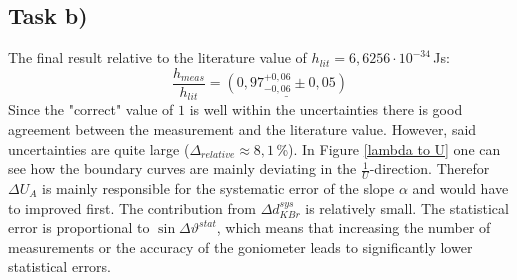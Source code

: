 \documentclass[a4paper,12pt]{article}
\newcommand{\kla}{}
\begin{document}
\subsection*{Task b)}
The final result relative to the literature value of $h_{lit}=6,6256\cdot 10^{-34}\,$Js:
$$\frac{h_{meas}}{h_{lit}}=\underline{\kla\left( {0,97_{-0,06}^{+0,06}\pm 0,05} \right)}$$
Since the "correct" value of $1$ is well within the uncertainties there is good agreement between the measurement and the literature value. However, said uncertainties are quite large ($\Delta_{relative}\approx 8,1\,$\%). In Figure \ref{lambda to U} one can see how the boundary curves are mainly deviating in the $\frac{1}{U}$-direction. Therefor $\Delta U_A$ is mainly responsible for the systematic error of the slope $\alpha$ and would have to improved first. The contribution from $\Delta d_{KBr}^{sys}$ is relatively small. The statistical error is proportional to $\sin\Delta\vartheta^{stat}$, which means that increasing the number of measurements or the accuracy of the goniometer leads to significantly lower statistical errors.
\end{document}
